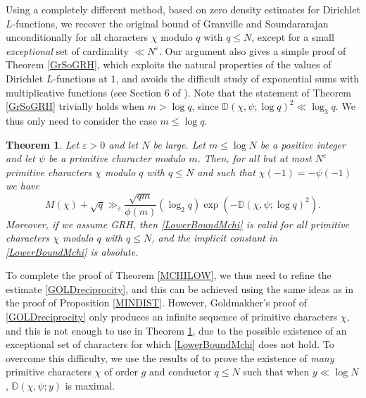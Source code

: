 \documentclass[12pt]{amsart}
\newtheorem{thm}{Theorem}[section]
\theoremstyle{definition}
\numberwithin{equation}{section}
\newcommand{\mb}{\mathbb}
\newcommand{\e}{\varepsilon}
\begin{document}
Using a completely different method, based on zero density estimates for Dirichlet $L$-functions, we recover the original bound of Granville and Soundararajan unconditionally for all characters $\chi$ modulo $q$ with $q\leq N$, except for a small \emph{exceptional} set of cardinality $\ll N^{\varepsilon}$. Our argument also gives a simple proof of Theorem \ref{GrSoGRH}, which exploits the natural properties of the values of Dirichlet $L$-functions at $1$, and avoids the difficult study of exponential sums with multiplicative functions (see Section 6 of \cite{GrSo2}). Note that the statement of Theorem \ref{GrSoGRH} trivially holds when $m > \log q$, since $\mb{D}(\chi,\psi;\log q)^2\ll \log_3 q$. We thus only need to consider the case $m\leq \log q$.
\begin{thm} \label{GL}
Let $\e > 0$ and let $N$ be large. Let $m \leq \log N$ be a positive integer and let $\psi$ be a primitive character modulo $m$.  Then, for all but at most $N^{\varepsilon}$ primitive characters $\chi$ modulo $q$ with   $q\leq N$ and such that $\chi(-1)=-\psi(-1)$ we have 
\begin{equation}\label{LowerBoundMchi}
M(\chi) + \sqrt{q} \gg_{\varepsilon} \frac{\sqrt{qm}}{\phi(m)} (\log_2 q) \exp\left(-\mb{D}(\chi,\psi;\log q)^2\right).
\end{equation}
Moreover, if we assume GRH, then \eqref{LowerBoundMchi} is valid for all primitive characters $\chi$ modulo $q$ with $q\leq N$, and the implicit constant in \eqref{LowerBoundMchi} is absolute.
\end{thm}
To complete the proof of Theorem \ref{MCHILOW}, we thus need to refine the estimate \eqref{GOLDreciprocity}, and this can be achieved using the same ideas as in the proof of Proposition \ref{MINDIST}. However, Goldmakher's proof of \eqref{GOLDreciprocity} only produces an infinite sequence of primitive characters $\chi$, and this is not enough to use in Theorem \ref{GL}, due to the possible existence of an exceptional set of characters for which \eqref{LowerBoundMchi} does not hold. To overcome this difficulty, we use the results of \cite{LAM} to prove the existence of \emph{many} primitive characters $\chi$ of order $g$ and conductor $q\leq N$ such that when $y \ll \log N$, $\mb{D}(\chi,\psi;y)$ is maximal.
\end{document}
